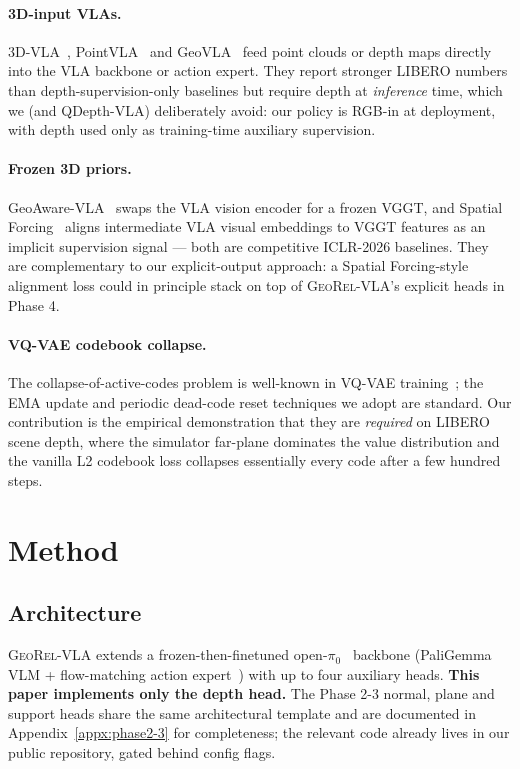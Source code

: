 \documentclass{article}
\newcommand{\geore}{\textsc{GeoRel-VLA}\xspace}
\begin{document}
\paragraph{3D-input VLAs.} 3D-VLA~\citep{zhen2024threedvla}, PointVLA~\citep{li2025pointvla} and GeoVLA~\citep{sun2025geovla} feed point clouds or depth maps directly into the VLA backbone or action expert. They report stronger LIBERO numbers than depth-supervision-only baselines but require depth at \emph{inference} time, which we (and QDepth-VLA) deliberately avoid: our policy is RGB-in at deployment, with depth used only as training-time auxiliary supervision.

\paragraph{Frozen 3D priors.} GeoAware-VLA~\citep{geoaware2025} swaps the VLA vision encoder for a frozen VGGT, and Spatial Forcing~\citep{spatialforcing2026} aligns intermediate VLA visual embeddings to VGGT features as an implicit supervision signal — both are competitive ICLR-2026 baselines. They are complementary to our explicit-output approach: a Spatial Forcing-style alignment loss could in principle stack on top of \geore's explicit heads in Phase 4.

\paragraph{VQ-VAE codebook collapse.} The collapse-of-active-codes problem is well-known in VQ-VAE training~\citep{vandenoord2017vqvae,razavi2019vqvae2}; the EMA update and periodic dead-code reset techniques we adopt are standard. Our contribution is the empirical demonstration that they are \emph{required} on LIBERO scene depth, where the simulator far-plane dominates the value distribution and the vanilla L2 codebook loss collapses essentially every code after a few hundred steps.

\section{Method}\label{sec:method}

\subsection{Architecture}\label{sec:method:arch}

\geore{} extends a frozen-then-finetuned open-$\pi_0$~\citep{ren2024openpi0} backbone (PaliGemma~\citep{paligemma2024} VLM + flow-matching action expert~\citep{lipman2022flowmatching}) with up to four auxiliary heads. \textbf{This paper implements only the depth head.} The Phase 2-3 normal, plane and support heads share the same architectural template and are documented in Appendix~\ref{appx:phase2-3} for completeness; the relevant code already lives in our public repository, gated behind config flags.
\end{document}
